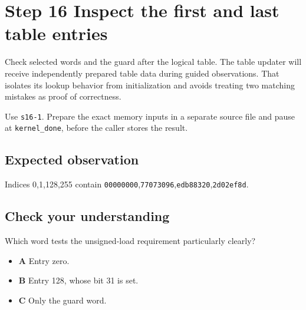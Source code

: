 \section{Step 16 Inspect the first and last table entries}\label{crc-s16}

Check selected words and the guard after the logical table. The table updater will receive independently prepared table data during guided observations. That isolates its lookup behavior from initialization and avoids treating two matching mistakes as proof of correctness.

Use \texttt{s16-1}. Prepare the exact memory inputs in a separate source file and pause at \texttt{kernel\_done}, before the caller stores the result.

\subsection{Expected observation}
Indices 0,1,128,255 contain \texttt{00000000},\texttt{77073096},\texttt{edb88320},\texttt{2d02ef8d}.

\subsection{Check your understanding}
Which word tests the unsigned-load requirement particularly clearly?

\begin{itemize}
  \item \textbf{A} Entry zero.
  \item \textbf{B} Entry 128, whose bit 31 is set.
  \item \textbf{C} Only the guard word.
\end{itemize}
